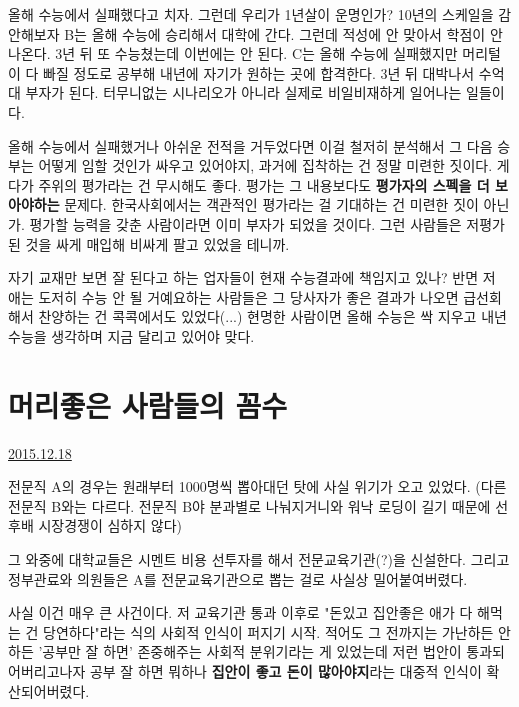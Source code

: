 올해 수능에서 실패했다고 치자. 그런데 우리가 1년살이 운명인가?
10년의 스케일을 감안해보자
B는 올해 수능에 승리해서 대학에 간다. 그런데 적성에 안 맞아서 학점이 안 나온다. 3년 뒤 또 수능쳤는데 이번에는 안 된다.
C는 올해 수능에 실패했지만 머리털이 다 빠질 정도로 공부해 내년에 자기가 원하는 곳에 합격한다. 3년 뒤 대박나서 수억대 부자가 된다.
터무니없는 시나리오가 아니라 실제로 비일비재하게 일어나는 일들이다.
\vspace{5mm}

올해 수능에서 실패했거나 아쉬운 전적을 거두었다면 이걸 철저히 분석해서
그 다음 승부는 어떻게 임할 것인가 싸우고 있어야지, 과거에 집착하는 건 정말 미련한 짓이다.
게다가 주위의 평가라는 건 무시해도 좋다. 평가는 그 내용보다도 \textbf{평가자의 스펙을 더 보아야하는} 문제다.
한국사회에서는 객관적인 평가라는 걸 기대하는 건 미련한 짓이 아닌가.
평가할 능력을 갖춘 사람이라면 이미 부자가 되었을 것이다. 그런 사람들은 저평가된 것을 싸게 매입해 비싸게 팔고 있었을 테니까.
\vspace{5mm}

자기 교재만 보면 잘 된다고 하는 업자들이 현재 수능결과에 책임지고 있나?
반면 저 애는 도저히 수능 안 될 거예요하는 사람들은 그 당사자가 좋은 결과가 나오면 급선회해서 찬양하는 건 콕콕에서도 있었다(...)
현명한 사람이면 올해 수능은 싹 지우고 내년 수능을 생각하며 지금 달리고 있어야 맞다.
\vspace{5mm}









\section{머리좋은 사람들의 꼼수}
\href{https://www.kockoc.com/Apoc/551136}{2015.12.18}

\vspace{5mm}

전문직 A의 경우는 원래부터 1000명씩 뽑아대던 탓에 사실 위기가 오고 있었다.
(다른 전문직 B와는 다르다. 전문직 B야 분과별로 나눠지거니와 워낙 로딩이 길기 때문에 선후배 시장경쟁이 심하지 않다)
\vspace{5mm}

그 와중에 대학교들은 시멘트 비용 선투자를 해서 전문교육기관(?)을 신설한다.
그리고 정부관료와 의원들은 A를 전문교육기관으로 뽑는 걸로 사실상 밀어붙여버렸다.
\vspace{5mm}

사실 이건 매우 큰 사건이다.
저 교육기관 통과 이후로 "돈있고 집안좋은 애가 다 해먹는 건 당연하다"라는 식의 사회적 인식이 퍼지기 시작.
적어도 그 전까지는 가난하든 안 하든 '공부만 잘 하면' 존중해주는 사회적 분위기라는 게 있었는데
저런 법안이 통과되어버리고나자 공부 잘 하면 뭐하나 \textbf{집안이 좋고 돈이 많아야지}라는 대중적 인식이 확산되어버렸다.
\vspace{5mm}

